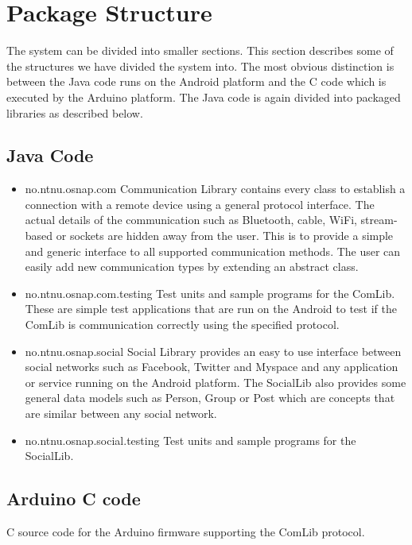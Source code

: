 \section{Package Structure}
The system can be divided into smaller sections. This section describes some of the structures
we have divided the system into. The most obvious distinction is between the Java code runs
on the Android platform and the C code which is executed by the Arduino platform.
The Java code is again divided into packaged libraries as described below.

\subsection{Java Code}
\begin{itemize}
\item{no.ntnu.osnap.com}\newline
Communication Library contains every class to establish a connection with a remote device using a general protocol interface. The actual details of the communication such as
Bluetooth, cable, WiFi, stream-based or sockets are hidden away from the user. This is to provide a simple and generic interface to all supported communication methods. The
user can easily add new communication types by extending an abstract class.
\item{no.ntnu.osnap.com.testing}\newline
Test units and sample programs for the ComLib. These are simple test applications that are run on the Android to test if the ComLib is communication correctly using the specified
protocol.
\item{no.ntnu.osnap.social}\newline
Social Library provides an easy to use interface between social networks such as Facebook, Twitter and Myspace and any application or service running on the Android platform.
The SocialLib also provides some general data models such as Person, Group or Post which are concepts that are similar between any social network. 
\item{no.ntnu.osnap.social.testing}  \newline
Test units and sample programs for the SocialLib.
\end{itemize}

\subsection{Arduino C code}
C source code for the Arduino firmware supporting the ComLib protocol.

